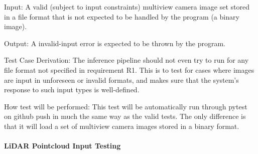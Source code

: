 \documentclass[12pt, titlepage]{article}
\begin{document}
\begin{enumerate}
Input: A valid (subject to input constraints) multiview camera image set stored in a file format that is not expected to be handled by the program (a binary image).
					
Output: A invalid-input error is expected to be thrown by the program.

Test Case Derivation: The inference pipeline should not even try to run for any file format not specified in requirement R1. This is to test for cases
where images are input in unforeseen or invalid formats, and makes sure that the system's response to such input types is well-defined. 

How test will be performed: This test will be automatically run through pytest on github push in much the same way as the valid tests. The only difference is that it will
load a set of multiview camera images stored in a binary format.

\end{enumerate}

\paragraph{LiDAR Pointcloud Input Testing}
\end{document}
